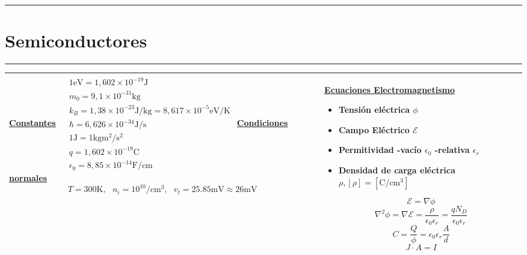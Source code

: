 \documentclass[../main.tex]{subfiles}
\begin{document}
\everymath{\displaystyle}
\hrule
\vspace*{-\baselineskip}
\vspace{0.05in}
\section{Semiconductores}
\hrule
\begin{xltabular}{\textwidth}{|X|X|}
  \hline
  \underline{\textbf{Constantes}}
  \newline\newline
  $\begin{aligned}
       & 1 \si{\electronvolt} =  1,602\times 10^{-19} \si{\J}                          \\
       & m_0 = 9,1 \times 10^{-31} \si{\kg}                                            \\
       & k_B = 1,38 \times 10^{-23} \si{\J\per\kg} = 8,617\times 10^{-5} \si{\eV\per\K} \\
       & \hbar = 6,626 \times 10^{-34} \si{\J\per\s}                                   \\
       & 1 \si{\J} = 1 \si{\kg\square\m\per\square\s}                                  \\
       & q = 1,602 \times 10^{-19} \si{\coulomb}                                       \\
       & \epsilon_0 = 8,85 \times 10^{-14} \si{\F\per\cm}
    \end{aligned}$
  \newline\newline
  \underline{\textbf{Condiciones normales}}
  $$T = 300\si{\K}, ~~~ n_i = 10^{10} \si{\per\cubic\cm}, ~~~ v_t = 25.85\si{\mV} \approx 26 \si{\mV}$$
  &
  \underline{\textbf{Ecuaciones Electromagnetismo}}
  \begin{itemize}
    \item Tensión eléctrica $\phi$
    \item Campo Eléctrico $\mathcal{E}$
    \item Permitividad -vacío $\epsilon_0$  -relativa $\epsilon_r$
    \item Densidad de carga eléctrica $\rho , [\rho] = [\si{\coulomb\per\cubic\cm}]$
  \end{itemize}
  $$\mathcal{E} = \nabla\phi$$
  $$\nabla^2\phi = \nabla\mathcal{E} = \frac{\rho}{\epsilon_0\epsilon_r} = \frac{qN_D}{\epsilon_0\epsilon_r}$$
  $$C = \frac{Q}{\phi} = \epsilon_0\epsilon_r \frac{A}{d}$$
  $$J\cdot A = I$$
  \\
  \hline
\end{xltabular}
\end{document}
